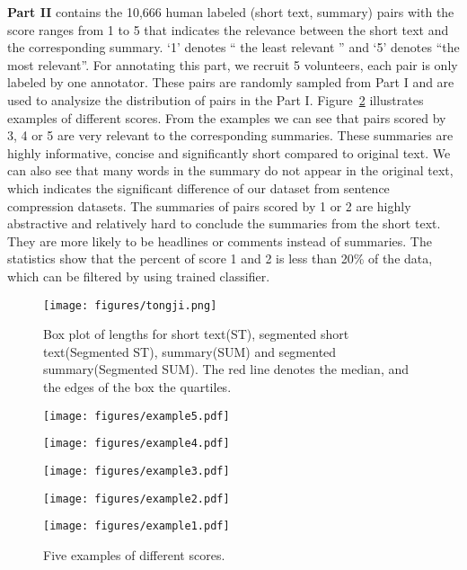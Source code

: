 \documentclass[11pt,a4paper]{article}
\begin{document}
\textbf{Part II} contains the 10,666 human labeled (short text, summary) pairs with the score ranges from 1 to 5 that indicates the relevance between the short text and the corresponding summary. `1' denotes `` the least relevant '' and `5' denotes ``the most relevant''.  For annotating this part,  we recruit 5 volunteers, each pair is only labeled by one annotator. These pairs are randomly sampled from Part I and are used to analysize the distribution of pairs in the Part I. Figure~\ref{fig_scores} illustrates examples of different scores. From the examples we can see that pairs scored by 3, 4 or 5 are very relevant to the corresponding summaries. These summaries are highly informative, concise and significantly short compared to original text. We can also see that many words in the summary do not appear in the original text, which indicates the significant difference  of our dataset from sentence compression datasets. The summaries of pairs scored by 1 or 2 are highly abstractive and relatively hard to conclude the summaries from the short text. They are more likely to be headlines or comments instead of summaries. The statistics show that the percent of score 1 and 2 is less than 20\% of the data, which can be filtered by using trained classifier.

\begin{figure}[!tb]
\centering
\texttt{[image: figures/tongji.png]}
\vspace{-25pt}
\caption{Box plot of lengths for short text(ST), segmented short text(Segmented ST), summary(SUM) and segmented summary(Segmented SUM). The red line denotes the median, and the edges of the box the quartiles. }
\label{tongji}
\vspace{-15pt}
\end{figure}


\begin{figure}[!tb]
\centering
\texttt{[image: figures/example5.pdf]}

\texttt{[image: figures/example4.pdf]}

\texttt{[image: figures/example3.pdf]}

\texttt{[image: figures/example2.pdf]}

\texttt{[image: figures/example1.pdf]}
\vspace{-25pt}
\caption{Five examples of different scores.}
\label{fig_scores}
\vspace{-20pt}
\end{figure}
\end{document}

